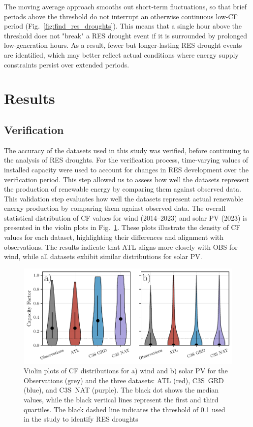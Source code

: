 \documentclass[preprint, 12pt]{elsarticle}
\begin{document}
The moving average approach smooths out short-term fluctuations, so that brief periods above the threshold do not interrupt an otherwise continuous low-CF period (Fig.~\ref{fig:find_res_droughts}). This means that a single hour above the threshold does not "break" a RES drought event if it is surrounded by prolonged low-generation hours. As a result, fewer but longer-lasting RES drought events are identified, which may better reflect actual conditions where energy supply constraints persist over extended periods.

\section{Results}
\label{sec:results}

\subsection{Verification}
\label{sec:verification}

The accuracy of the datasets used in this study was verified, before continuing to the analysis of RES droughts. For the verification process, time-varying values of installed capacity were used to account for changes in RES development over the verification period. This step allowed us to assess how well the datasets represent the production of renewable energy by comparing them against observed data. This validation step evaluates how well the datasets represent actual renewable energy production by comparing them against observed data. The overall statistical distribution of CF values for wind (2014–2023) and solar PV (2023) is presented in the violin plots in Fig.~\ref{fig:violin_plots}. These plots illustrate the density of CF values for each dataset, highlighting their differences and alignment with observations. The results indicate that ATL aligns more closely with OBS for wind, while all datasets exhibit similar distributions for solar PV.

\begin{figure}[ht!]
	\centering
	\includegraphics[width=\textwidth]{violin_plots_verification.pdf}
	\caption{Violin plots of CF distributions for a)  wind and b) solar PV for the Observations (grey) and the three datasets: ATL (red), C3S~GRD (blue), and C3S~NAT (purple). The black dot shows the median values, while the black vertical lines represent the first and third quartiles. The black dashed line indicates the threshold of 0.1 used in the study to identify RES droughts}
	\label{fig:violin_plots}
\end{figure}
\end{document}

